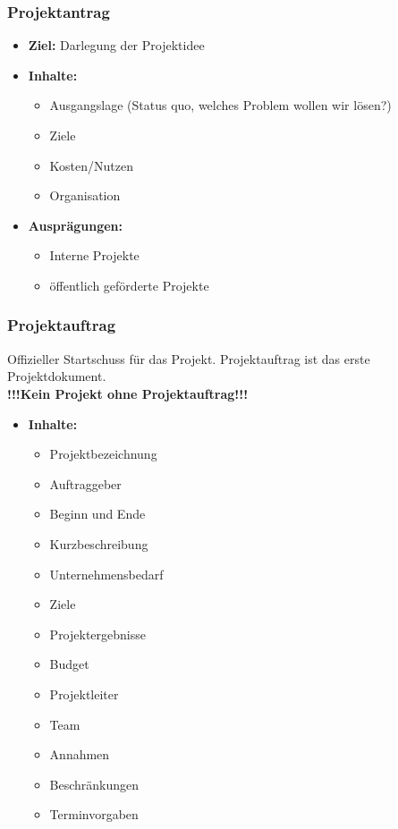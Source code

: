 \documentclass[11pt, a4paper]{article}
\begin{document}
\subsubsection{Projektantrag}

\begin{itemize}
    \item \textbf{Ziel:} Darlegung der Projektidee
    \item \textbf{Inhalte:}
    \begin{itemize}
        \item Ausgangslage (Status quo, welches Problem wollen wir lösen?)
        \item Ziele
        \item Kosten/Nutzen
        \item Organisation
    \end{itemize}
    \item \textbf{Ausprägungen:}
    \begin{itemize}
        \item Interne Projekte
        \item öffentlich geförderte Projekte
    \end{itemize}
\end{itemize}

\newpage

\subsubsection{Projektauftrag}

Offizieller Startschuss für das Projekt. Projektauftrag ist das erste Projektdokument. \\
\textbf{!!!Kein Projekt ohne Projektauftrag!!!}

\begin{itemize}
    \item \textbf{Inhalte:} 
    \begin{itemize}
        \item Projektbezeichnung
        \item Auftraggeber
        \item Beginn und Ende
        \item Kurzbeschreibung
        \item Unternehmensbedarf
        \item Ziele
        \item Projektergebnisse
        \item Budget
        \item Projektleiter
        \item Team
        \item Annahmen
        \item Beschränkungen
        \item Terminvorgaben
    \end{itemize}
\end{itemize}
\end{document}
